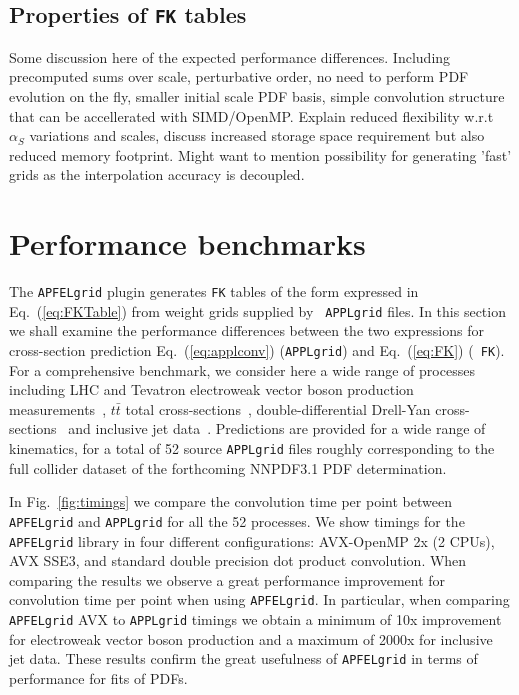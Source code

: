 \documentclass[preprint,12pt]{elsarticle}
\begin{document}
\subsection{Properties of {\tt FK} tables}
Some discussion here of the expected performance
differences. Including precomputed sums over scale, perturbative
order, no need to perform PDF evolution on the fly, smaller initial
scale PDF basis, simple convolution structure that can be accellerated
with SIMD/OpenMP.  Explain reduced flexibility w.r.t $\alpha_S$
variations and scales, discuss increased storage space requirement but
also reduced memory footprint.  Might want to mention possibility for
generating 'fast' grids as the interpolation accuracy is decoupled.

\section{Performance benchmarks}
\label{sec:benchmark}

The {\tt APFELgrid} plugin generates {\tt FK} tables of the form
expressed in Eq.~(\ref{eq:FKTable}) from weight grids supplied by {\tt
  APPLgrid} files. In this section we shall examine the performance
differences between the two expressions for cross-section prediction
Eq.~(\ref{eq:applconv}) ({\tt APPLgrid}) and Eq.~(\ref{eq:FK}) ({\tt
  FK}).
%
For a comprehensive benchmark, we consider here a wide range of
processes including LHC and Tevatron electroweak vector boson
production
measurements~\cite{Aaij:2012mda,Aaij:2012vn,Chatrchyan:2013mza,Chatrchyan:2013uja,Chatrchyan:2012xt,Aad:2013iua,Aad:2011fp,Aad:2011dm,Aaltonen:2010zza},
$t\bar{t}$ total
cross-sections~\cite{ATLAS:2012aa,ATLAS:2011xha,TheATLAScollaboration:2013dja,Chatrchyan:2013faa,Chatrchyan:2012bra,Chatrchyan:2012ria},
double-differential Drell-Yan
cross-sections~\cite{Chatrchyan:2013tia,CMS:2014jea} and inclusive jet
data~\cite{Chatrchyan:2012bja,Aad:2011fc,Aad:2013lpa,Abazov:2007jy}. Predictions
are provided for a wide range of kinematics, for a total of 52 source
{\tt APPLgrid} files roughly corresponding to the full collider
dataset of the forthcoming NNPDF3.1 PDF determination.

In Fig.~\ref{fig:timings} we compare the convolution time per point
between {\tt APFELgrid} and {\tt APPLgrid} for all the 52
processes. We show timings for the {\tt APFELgrid} library in four
different configurations: AVX-OpenMP 2x (2 CPUs), AVX SSE3, and
standard double precision dot product convolution. When comparing the
results we observe a great performance improvement for convolution
time per point when using {\tt APFELgrid}. In particular, when
comparing {\tt APFELgrid} AVX to {\tt APPLgrid} timings we obtain a
minimum of 10x improvement for electroweak vector boson production and
a maximum of 2000x for inclusive jet data. These results confirm the
great usefulness of {\tt APFELgrid} in terms of performance for fits
of PDFs.
\end{document}
